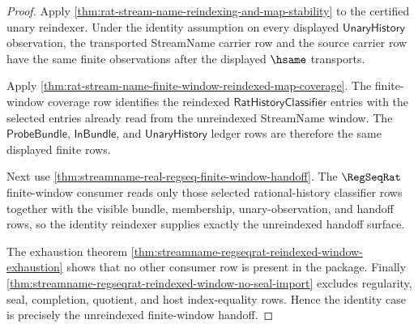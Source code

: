 \begin{proof}
Apply \autoref{thm:rat-stream-name-reindexing-and-map-stability} to the
certified unary reindexer. Under the identity assumption on every displayed
$\mathsf{UnaryHistory}$ observation, the transported StreamName carrier row and
the source carrier row have the same finite observations after the displayed
$\hsame$ transports.

Apply \autoref{thm:rat-stream-name-finite-window-reindexed-map-coverage}. The
finite-window coverage row identifies the reindexed
$\mathsf{RatHistoryClassifier}$ entries with the selected entries already read
from the unreindexed StreamName window. The $\mathsf{ProbeBundle}$,
$\mathsf{InBundle}$, and $\mathsf{UnaryHistory}$ ledger rows are therefore the
same displayed finite rows.

Next use \autoref{thm:streamname-real-regseq-finite-window-handoff}. The
$\RegSeqRat$ finite-window consumer reads only those selected rational-history
classifier rows together with the visible bundle, membership, unary-observation,
and handoff rows, so the identity reindexer supplies exactly the unreindexed
handoff surface.

The exhaustion theorem
\autoref{thm:streamname-regseqrat-reindexed-window-exhaustion} shows that no
other consumer row is present in the package. Finally
\autoref{thm:streamname-regseqrat-reindexed-window-no-seal-import} excludes
regularity, seal, completion, quotient, and host index-equality rows. Hence the
identity case is precisely the unreindexed finite-window handoff.
\end{proof}

